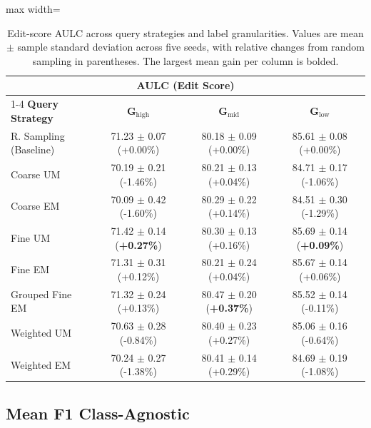 \begin{table}[htbp]
    \centering
    \caption{Edit-score AULC across query strategies and label granularities. Values are mean $\pm$ sample standard deviation across five seeds, with relative changes from random sampling in parentheses. The largest mean gain per column is bolded.}
    \label{tab:aulc_edit}
    \small
    \begin{adjustbox}{max width=\textwidth}
        \begin{tabular}{lccc}
            \toprule
            \multicolumn{4}{c}{\textbf{AULC (Edit Score)}} \\
            \cmidrule(lr){1-4}
            \textbf{Query Strategy} & $\boldsymbol{G_{\mathrm{high}}}$ & $\boldsymbol{G_{\mathrm{mid}}}$ & $\boldsymbol{G_{\mathrm{low}}}$ \\
            \midrule
            R. Sampling (Baseline) & 71.23 $\pm$ 0.07 (+0.00\%) & 80.18 $\pm$ 0.09 (+0.00\%) & 85.61 $\pm$ 0.08 (+0.00\%) \\
            Coarse UM               & 70.19 $\pm$ 0.21 (-1.46\%) & 80.21 $\pm$ 0.13 (+0.04\%) & 84.71 $\pm$ 0.17 (-1.06\%) \\
            Coarse EM               & 70.09 $\pm$ 0.42 (-1.60\%) & 80.29 $\pm$ 0.22 (+0.14\%) & 84.51 $\pm$ 0.30 (-1.29\%) \\
            Fine UM                 & 71.42 $\pm$ 0.14 (\textbf{+0.27\%}) & 80.30 $\pm$ 0.13 (+0.16\%) & 85.69 $\pm$ 0.14 (\textbf{+0.09\%}) \\
            Fine EM                 & 71.31 $\pm$ 0.31 (+0.12\%) & 80.21 $\pm$ 0.24 (+0.04\%) & 85.67 $\pm$ 0.14 (+0.06\%) \\
            Grouped Fine EM         & 71.32 $\pm$ 0.24 (+0.13\%) & 80.47 $\pm$ 0.20 (\textbf{+0.37\%}) & 85.52 $\pm$ 0.14 (-0.11\%) \\
            Weighted UM             & 70.63 $\pm$ 0.28 (-0.84\%) & 80.40 $\pm$ 0.23 (+0.27\%) & 85.06 $\pm$ 0.16 (-0.64\%) \\
            Weighted EM             & 70.24 $\pm$ 0.27 (-1.38\%) & 80.41 $\pm$ 0.14 (+0.29\%) & 84.69 $\pm$ 0.19 (-1.08\%) \\
            \bottomrule
        \end{tabular}
    \end{adjustbox}
\end{table}

\subsection{Mean F1 Class-Agnostic}

